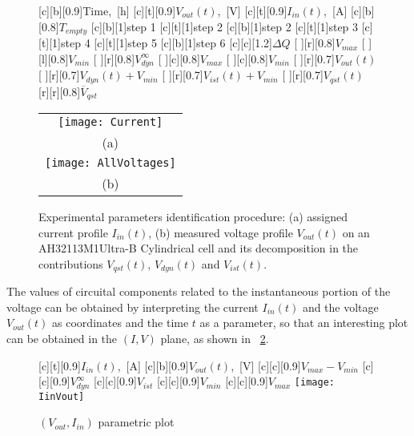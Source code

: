 \documentclass[journal]{IEEEtran}
\begin{document}
\begin{figure}[!htbp]
    [c][b][0.9]{\scriptsize{Time,~[h]}}
    [c][t][0.9]{\scriptsize{$V_{out}(t)$,~[V]}}
    [c][t][0.9]{\scriptsize{$I_{in}(t)$,~[A]}}
    [c][b][0.8]{\tiny{$T_{empty}$}}
    [c][b][1]{\tiny{step 1}}
    [c][t][1]{\tiny{step 2}}
    [c][b][1]{\tiny{step 2}}
    [c][t][1]{\tiny{step 3}}
    [c][t][1]{\tiny{step 4}}
    [c][t][1]{\tiny{step 5}}
    [c][b][1]{\tiny{step 6}}
    [c][c][1.2]{\tiny{$\Delta Q$}}
    [ ][r][0.8]{\tiny{$V_{max}$}}
    [ ][l][0.8]{\tiny{$V_{min}$}}
    [ ][r][0.8]{\tiny{$V_{dyn}^{\infty}$}}
    [ ][c][0.8]{\tiny{$V_{max}$}}
    [ ][c][0.8]{\tiny{$V_{min}$}}
    [ ][r][0.7]{\tiny{$V_{out}(t)$}}
    [ ][r][0.7]{\tiny{$V_{dyn}(t)+V_{min}$}}
    [ ][r][0.7]{\tiny{$V_{ist}(t)+V_{min}$}}
    [ ][r][0.7]{\tiny{$V_{qst}(t)$}}
    [r][r][0.8]{\tiny{$\overline{V}_{qst}$}}
	\centering
	\begin{tabular}{c}
		\texttt{[image: Current]} \\
		(a) \\
        \hspace{-0.3cm}	
		\texttt{[image: AllVoltages]} \\
		(b) \\
	\end{tabular}
	\caption{Experimental parameters identification procedure: (a) assigned current profile $I_{in}(t)$, (b) measured voltage profile $V_{out}(t)$ on an AH32113M1Ultra-B Cylindrical cell and its decomposition in the contributions $V_{qst}(t)$, $V_{dyn}(t)$ and $V_{ist}(t)$.}
\label{fig::IandV}
\end{figure}
The values of circuital components related to the instantaneous portion of the voltage can be obtained by interpreting the current $I_{in}(t)$ and the voltage $V_{out}(t)$ as coordinates and the time $t$ as a parameter, so that an interesting plot can be obtained in the $(I,V)$ plane, as shown in \figurename~\ref{fig::IinVout}. 
\begin{figure}[!htbp]
    [c][t][0.9]{\tiny{$I_{in}(t)$,~[A]}}
    [c][b][0.9]{\tiny{$V_{out}(t)$,~[V]}}
    [c][c][0.9]{\tiny{$V_{max}-V_{min}$}}
    [c][c][0.9]{\tiny{$V_{dyn}^{\infty}$}}
    [c][c][0.9]{\tiny{$V_{ist}$}}
    [c][c][0.9]{\tiny{$V_{min}$}}
    [c][c][0.9]{\tiny{$V_{max}$}}
    \centering
		\texttt{[image: IinVout]}
	\caption{$(V_{out},I_{in})$ parametric plot}
	\label{fig::IinVout}
\end{figure}
\end{document}

